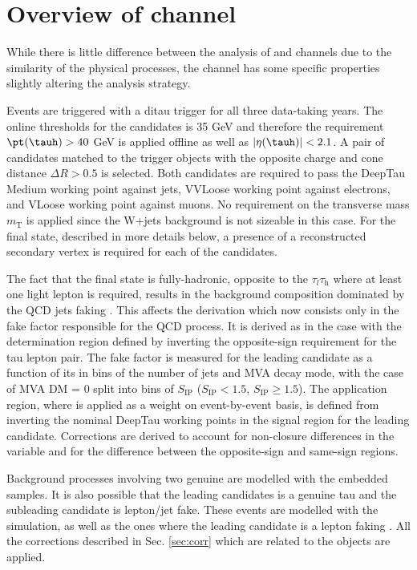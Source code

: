 \section{Overview of \tata channel}\label{sec:tata}
While there is little difference between the analysis of \et and \mt channels due to the similarity of the physical processes, the \tata channel has some specific properties slightly altering the analysis strategy. 

Events are triggered with a ditau trigger for all three data-taking years. The online \pt thresholds for the candidates is 35 GeV and therefore the requirement $\pt(\tauh) > 40$ GeV is applied offline as well as $|\eta(\tauh)| < 2.1$. A pair of \tauh candidates matched to the trigger objects with the opposite charge and cone distance $\Delta R > 0.5$ is selected. Both candidates are required to pass the DeepTau Medium working point against jets, VVLoose working point against electrons, and VLoose working point against muons. No requirement on the transverse mass $m_\text{T}$ is applied since the W+jets background is not sizeable in this case. For the \aaa final state, described in more details below, a presence of a reconstructed secondary vertex is required for each of the \tauh candidates.

The fact that the \tata final state is fully-hadronic, opposite to the $\tau_l\tau_\mathrm{h}$ where at least one light lepton is required, results in the background composition dominated by the QCD jets faking \tauh. This affects the \ff derivation which now consists only in the fake factor responsible for the QCD process. It is derived as in the \et case with the determination region defined by inverting the opposite-sign requirement for the tau lepton pair. The fake factor is measured for the leading \tauh candidate as a function of its \pt in bins of the number of jets and MVA decay mode, with the case of MVA DM = 0 split into bins of $S_\text{IP}$ ($S_\text{IP} < 1.5$, $S_\text{IP} \ge 1.5$). The application region, where \ff is applied as a weight on event-by-event basis, is defined from inverting the nominal DeepTau working points in the signal region for the leading \tauh candidate. Corrections are derived to account for non-closure differences in the \met variable and for the difference between the opposite-sign and same-sign regions. 

Background processes involving two genuine \tauh are modelled with the embedded samples. It is also possible that the leading \tauh candidates is a genuine tau and the subleading \tauh candidate is lepton/jet fake. These events are modelled with the simulation, as well as the ones where the leading \tauh candidate is a lepton faking \tauh. All the corrections described in Sec. \ref{sec:corr} which are related to the \tauh objects are applied.

